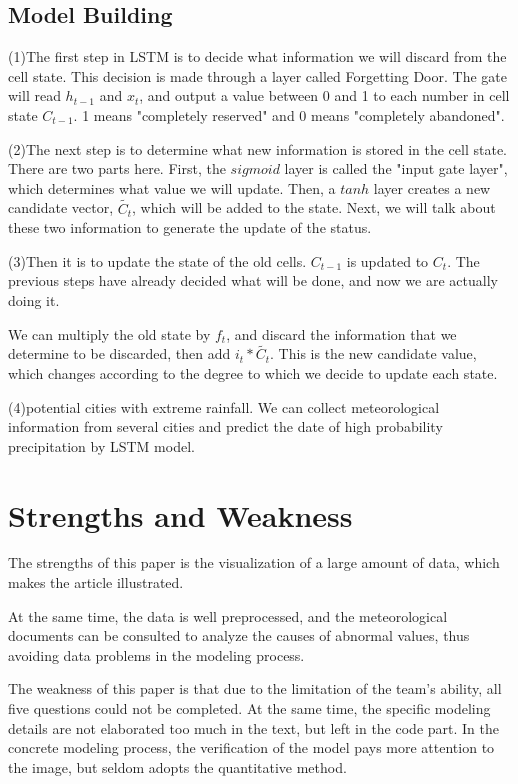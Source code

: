 \documentclass{swmcmthesis}
\begin{document}
\subsection{Model Building}
\hspace{1.25em}
(1)The first step in LSTM is to decide what information we will discard from the cell state. This decision is made through a layer called Forgetting Door. The gate will read $h_{t-1}$ and $x_{t}$, and output a value between 0 and 1 to each number in cell state $C_{t-1}$. 1 means "completely reserved" and 0 means "completely abandoned".
\par
(2)The next step is to determine what new information is stored in the cell state. There are two parts here. First, the $sigmoid$ layer is called the "input gate layer", which determines what value we will update. Then, a $tanh$ layer creates a new candidate vector, $\tilde{C_{t}} $, which will be added to the state. Next, we will talk about these two information to generate the update of the status.
\par
(3)Then it is to update the state of the old cells. $C_{t-1}$ is updated to $C_{t}$. The previous steps have already decided what will be done, and now we are actually doing it.
\par 
We can multiply the old state by $f_{t}$, and discard the information that we determine to be discarded, then add $i_t*\tilde{C_{t}}$. This is the new candidate value, which changes according to the degree to which we decide to update each state.
\par
(4)potential cities with extreme rainfall. We can collect meteorological information from several cities and predict the date of high probability precipitation by LSTM model.

\section{Strengths and Weakness}
\hspace{1.5em}
The strengths of this paper is the visualization of a large amount of data, which makes the article illustrated.
\par
At the same time, the data is well preprocessed, and the meteorological documents can be consulted to analyze the causes of abnormal values, thus avoiding data problems in the modeling process.
\par
The weakness of this paper is that due to the limitation of the team's ability, all five questions could not be completed. At the same time, the specific modeling details are not elaborated too much in the text, but left in the code part. In the concrete modeling process, the verification of the model pays more attention to the image, but seldom adopts the quantitative method.
\end{document}
